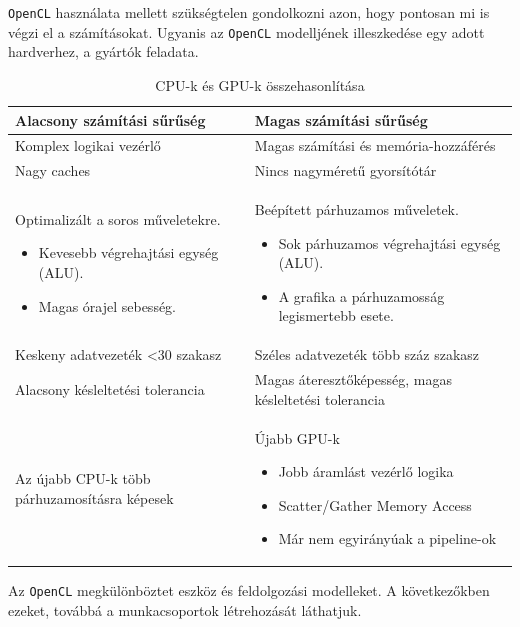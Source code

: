 \texttt{OpenCL} használata mellett szükségtelen gondolkozni azon, hogy pontosan mi is végzi el a számításokat. Ugyanis az \texttt{OpenCL} modelljének illeszkedése egy adott hardverhez, a gyártók feladata.

\begin{table}[h!]
\centering
\caption{CPU-k és GPU-k összehasonlítása}
\label{tab:cpuvsgpu}
\medskip
\begin{tabular}{|p{7cm}|p{7cm}|}
\hline
Alacsony számítási sűrűség & Magas számítási sűrűség \\
\hline
Komplex logikai vezérlő & Magas számítási és memória-hozzáférés \\
\hline
Nagy caches & Nincs nagyméretű gyorsítótár  \\
\hline
Optimalizált a soros műveletekre.
\begin{itemize}
	\item Kevesebb végrehajtási egység (ALU).
	\item Magas órajel sebesség.
\end{itemize} & Beépített párhuzamos műveletek.
\begin{itemize}
	\item Sok párhuzamos végrehajtási egység (ALU).
	\item A grafika a párhuzamosság legismertebb esete.
\end{itemize} \\
\hline
Keskeny adatvezeték <30 szakasz & Széles adatvezeték több száz szakasz \\
\hline
Alacsony késleltetési tolerancia & Magas áteresztőképesség, magas késleltetési tolerancia \\
\hline
Az újabb CPU-k több párhuzamosításra képesek & Újabb GPU-k
\begin{itemize}
	\item Jobb áramlást vezérlő logika
	\item Scatter/Gather Memory Access
	\item Már nem egyirányúak a pipeline-ok
\end{itemize} \\
\hline
\end{tabular}
\end{table}

Az \texttt{OpenCL} megkülönböztet eszköz és feldolgozási modelleket. A következőkben ezeket, továbbá a munkacsoportok létrehozását láthatjuk.


